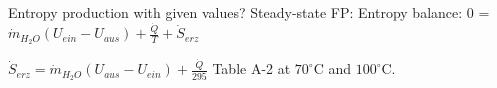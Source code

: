 Entropy production with given values?  
Steady-state FP: Entropy balance:  
0 = \( \dot{m}_{H_2O} (U_{ein} - U_{aus}) + \frac{\dot{Q}}{T} + \dot{S}_{erz} \)  

\( \dot{S}_{erz} = \dot{m}_{H_2O} (U_{aus} - U_{ein}) + \frac{\dot{Q}}{295} \)  
Table A-2 at \( 70^\circ \text{C} \) and \( 100^\circ \text{C} \).
